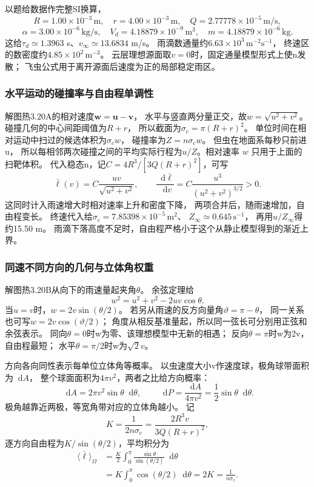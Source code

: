 \documentclass[UTF8,fontset=fandol,a4paper,11pt]{ctexart}
\newcommand{\dd}{\mathop{}\!\mathrm{d}}
\begin{document}
以题给数据作完整SI换算，
\[
R=1.00\times10^{-3}\,\mathrm m,\quad
r=4.00\times10^{-3}\,\mathrm m,\quad
Q=2.77778\times10^{-5}\,\mathrm{m/s},
\]
\[
\alpha=3.00\times10^{-6}\,\mathrm{kg/s},\quad
V_d=4.18879\times10^{-9}\,\mathrm{m^3},\quad
m=4.18879\times10^{-6}\,\mathrm{kg}.
\]
这给$\tau_d\simeq1.3963$ s、$v_\infty\simeq13.6834$ m/s。
雨滴数通量约$6.63\times10^3\,\mathrm{m^{-2}s^{-1}}$，
终速区的数密度约$4.85\times10^2\,\mathrm{m^{-3}}$。
云层理想源面取$v=0$时，固定通量模型形式上使n发散；
飞虫公式用于离开源面后速度为正的局部稳定雨区。

\subsubsection*{水平运动的碰撞率与自由程单调性}
解图热3.20A的相对速度$\bm w=\bm u-\bm v$，
水平与竖直两分量正交，故$w=\sqrt{u^2+v^2}$。
碰撞几何的中心间距阈值为$R+r$，
所以截面为$\sigma_c=\pi(R+r)^2$。
单位时间在相对运动中扫过的候选体积为$\sigma_cw$，
碰撞率为$Z=n\sigma_cw$。
但虫在地面系每秒只前进u，
所以每相邻两次碰撞之间的平均实际行程为$u/Z$。相对速率 $w$ 只用于上面的扫靶体积。
代入稳态n，记$C=4R^3/[3Q(R+r)^2]$，可写
\[
\bar\ell(v)=C\frac{uv}{\sqrt{u^2+v^2}},\qquad
\frac{\dd\bar\ell}{\dd v}
=C\frac{u^3}{(u^2+v^2)^{3/2}}>0.
\]
这同时计入雨速增大时相对速率上升和密度下降，
两项合并后，随雨速增加，自由程变长。
终速代入给$\sigma_c=7.85398\times10^{-5}\,\mathrm{m^2}$、
$Z_\infty\simeq0.645\,\mathrm{s^{-1}}$，
再用$u/Z_\infty$得约15.50 m。
雨滴下落高度不足时，自由程严格小于这个从静止模型得到的渐近上界。

\subsubsection*{同速不同方向的几何与立体角权重}
解图热3.20B从向下的雨速量起夹角$\theta$。
余弦定理给
\[
w^2=u^2+v^2-2uv\cos\theta.
\]
当$u=v$时，$w=2v\sin(\theta/2)$。
若另从雨速的反方向量角$\vartheta=\pi-\theta$，
同一关系也可写$w=2v\cos(\vartheta/2)$；
角度从相反基准量起，所以同一弦长可分别用正弦和余弦表示。
同向$\theta=0$时w为零、该理想模型中无新的相遇；
反向$\theta=\pi$时w为2v，自由程最短；
水平$\theta=\pi/2$时w为$\sqrt2v$。

方向各向同性表示每单位立体角等概率。
以虫速度大小v作速度球，极角球带面积为$\dd A$，
整个球面面积为$4\pi v^2$，两者之比给方向概率：
\[
\dd A=2\pi v^2\sin\theta\dd\theta,\qquad
\dd P=\frac{\dd A}{4\pi v^2}=\frac12\sin\theta\dd\theta.
\]
极角越靠近两极，等宽角带对应的立体角越小。
记
\[
K=\frac1{2n\sigma_c}=\frac{2R^3v}{3Q(R+r)^2},
\]
逐方向自由程为$K/\sin(\theta/2)$，平均积分为
\[
\begin{aligned}
\langle\bar\ell\rangle_\Omega
&=\frac K2\int_0^\pi
\frac{\sin\theta}{\sin(\theta/2)}\dd\theta\\
&=K\int_0^\pi\cos(\theta/2)\dd\theta
=2K=\frac1{n\sigma_c}.
\end{aligned}
\]
\end{document}
